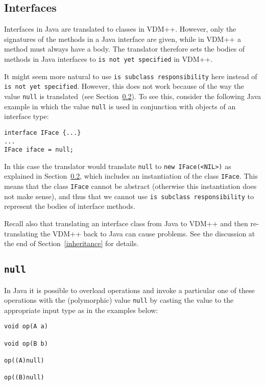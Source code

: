 \documentclass[\pformat,12pt]{article}
\begin{document}
\subsection{Interfaces}\label{interface}

Interfaces in Java are translated to classes in VDM++. However, only
the signatures of the methods in a Java interface are given, while in
VDM++ a method must always have a body. The translator therefore sets
the bodies of methods in Java interfaces to \texttt{is not yet
  specified} in VDM++. 

It might seem more natural to use \texttt{is subclass responsibility}
  here instead of \texttt{is not yet specified}. However, this does
  not work because of the way the value \texttt{null} is
  translated~(see Section~\ref{null}). To see this, consider the
  following Java example in which the value \texttt{null} is used in
  conjunction with objects of an interface type:

\begin{small}
\begin{verbatim}
interface IFace {...}
...
IFace iface = null;
\end{verbatim}
\end{small}

In this case the translator would translate \texttt{null} to
\texttt{new IFace(<NIL>)} as explained in 
Section~\ref{null}, which includes an instantiation of the class
\texttt{IFace}. This means that the class \texttt{IFace} cannot be
abstract (otherwise this instantiation does not make sense), and thus
that we cannot use \texttt{is subclass responsibility} to represent
the bodies of interface methods.

Recall also that translating an interface class from Java to VDM++ and
then re-translating the VDM++ back to Java can cause problems. See the
discussion at the end of Section~\ref{inheritance} for details.


\subsection{\texttt{null}}\label{null}

In Java it is possible to overload operations and invoke a particular
one of these operations with the (polymorphic) value \texttt{null} by
casting the value to the appropriate input type as in the examples
below: 

\begin{small}
\begin{verbatim}
void op(A a)  
 
void op(B b)   

op((A)null)

op((B)null)
\end{verbatim}
\end{small}
\end{document}

